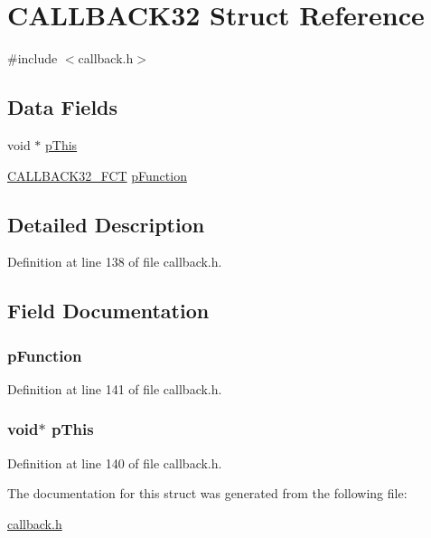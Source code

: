 \hypertarget{a00009}{
\section{CALLBACK32 Struct Reference}
\label{a00009}
}


{\ttfamily \#include $<$callback.h$>$}

\subsection*{Data Fields}
\begin{DoxyCompactItemize}
\item 
void $\ast$ \hyperlink{a00009_a9603b95573753f229a989062644bdbc3}{pThis}
\item 
\hyperlink{a00466_a2c7065cf157f660a6d0ff87a54557e3c}{CALLBACK32\_\-FCT} \hyperlink{a00009_a9cd6038c0af5b76c104ef20e673cd28c}{pFunction}
\end{DoxyCompactItemize}


\subsection{Detailed Description}


Definition at line 138 of file callback.h.



\subsection{Field Documentation}
\hypertarget{a00009_a9cd6038c0af5b76c104ef20e673cd28c}{
\subsubsection[{pFunction}]{ {\bf pFunction}}}
\label{a00009_a9cd6038c0af5b76c104ef20e673cd28c}


Definition at line 141 of file callback.h.

\hypertarget{a00009_a9603b95573753f229a989062644bdbc3}{
\subsubsection[{pThis}]{\setlength{\rightskip}{0pt plus 5cm}void$\ast$ {\bf pThis}}}
\label{a00009_a9603b95573753f229a989062644bdbc3}


Definition at line 140 of file callback.h.



The documentation for this struct was generated from the following file:\begin{DoxyCompactItemize}
\item 
\hyperlink{a00466}{callback.h}\end{DoxyCompactItemize}

